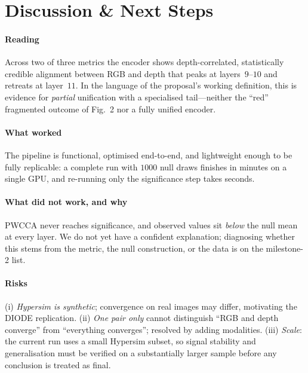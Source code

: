 \documentclass[10pt,conference,compsocconf]{IEEEtran}
\begin{document}
\section{Discussion \& Next Steps}
\label{sec:next}

\paragraph{Reading}
Across two of three metrics the encoder shows depth-correlated,
statistically credible alignment between RGB and depth that peaks at
layers~$9$--$10$ and retreats at layer~$11$. In the language of the
proposal's working definition, this is evidence for \emph{partial}
unification with a specialised tail---neither the ``red'' fragmented
outcome of Fig.~2 nor a fully unified encoder.

\paragraph{What worked}
The pipeline is functional, optimised end-to-end, and lightweight
enough to be fully replicable: a complete run with $1000$ null draws
finishes in minutes on a single GPU, and re-running only the
significance step takes seconds.

\paragraph{What did not work, and why}
PWCCA never reaches significance, and observed values sit
\emph{below} the null mean at every layer. We do not yet have a
confident explanation; diagnosing whether this stems from the metric,
the null construction, or the data is on the milestone-2 list.

\paragraph{Risks}
(i) \emph{Hypersim is synthetic}; convergence on real images may
differ, motivating the DIODE replication. (ii) \emph{One pair only}
cannot distinguish ``RGB and depth converge'' from ``everything
converges''; resolved by adding modalities. (iii) \emph{Scale}: the
current run uses a small Hypersim subset, so signal stability and
generalisation must be verified on a substantially larger sample
before any conclusion is treated as final.
\end{document}

